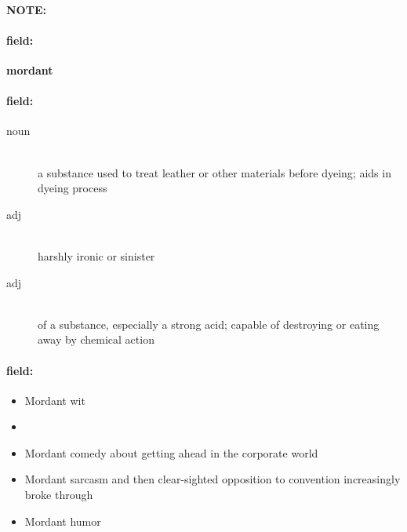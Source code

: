 \documentclass[12pt]{article}
\newenvironment{note}{\paragraph{NOTE:}}{}
\newenvironment{field}{\paragraph{field:}}{}
\begin{document}
\begin{note}
\begin{field}
\textbf{\large mordant}
\end{field}


\begin{field}
\begin{description}
\item[noun] \hfill \\ 
a substance used to treat leather or other materials before dyeing; aids in dyeing process

\item[adj] \hfill \\ 
harshly ironic or sinister

\item[adj] \hfill \\ 
of a substance, especially a strong acid; capable of destroying or eating away by chemical action

\end{description}
\end{field}

\begin{field}
\begin{itemize}
\item Mordant wit
\item 
\item Mordant comedy about getting ahead in the corporate world
\item Mordant sarcasm and then clear-sighted opposition to convention increasingly broke through
\item Mordant humor
\end{itemize}
\end{field}
\end{note}
\end{document}
